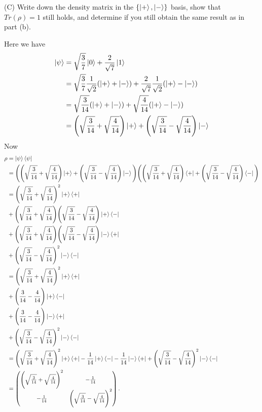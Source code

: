 \documentclass[10pt]{article}
\begin{document}
(C) Write down the density matrix in the $\{ \ket{+}, \ket{-} \}$ basis, show that $Tr(\rho) = 1$ still holds, and determine if you still obtain the same result as in part (b).

Here we have
\begin{align*}
\ket{\psi} &= \sqrt{\frac{3}{7}} \ket{0} + \frac{2}{\sqrt{7}} \ket{1} \\
                &= \sqrt{\frac{3}{7}} \frac{1}{\sqrt{2}} (\ket{+} + \ket{-}) + \frac{2}{\sqrt{7}} \frac{1}{\sqrt{2}} (\ket{+} - \ket{-}) \\
                &= \sqrt{\frac{3}{14}} (\ket{+} + \ket{-}) + \sqrt{\frac{4}{14}}(\ket{+} - \ket{-}) \\
                &= \Bigg( \sqrt{\frac{3}{14}} + \sqrt{\frac{4}{14}} \Bigg) \ket{+} + \Bigg( \sqrt{\frac{3}{14}}- \sqrt{\frac{4}{14}} \Bigg) \ket{-} 
\end{align*}
Now
\begin{align*}
\rho &= \ket{\psi} \bra{\psi} \\
        &= \Bigg( \Bigg( \sqrt{\frac{3}{14}} + \sqrt{\frac{4}{14}} \Bigg) \ket{+} + \Bigg( \sqrt{\frac{3}{14}}- \sqrt{\frac{4}{14}} \Bigg) \ket{-} \Bigg) \Bigg( \Bigg( \sqrt{\frac{3}{14}} + \sqrt{\frac{4}{14}} \Bigg) \bra{+} + \Bigg( \sqrt{\frac{3}{14}}- \sqrt{\frac{4}{14}} \Bigg) \bra{-} \Bigg) \\
        &= 
        \Bigg( \sqrt{\frac{3}{14}} + \sqrt{\frac{4}{14}} \Bigg)^2 \ket{+} \bra{+} \\
        &+ \Bigg( \sqrt{\frac{3}{14}} + \sqrt{\frac{4}{14}} \Bigg) \Bigg( \sqrt{\frac{3}{14}}- \sqrt{\frac{4}{14}} \Bigg) \ket{+} \bra{-} \\
        &+ \Bigg( \sqrt{\frac{3}{14}} + \sqrt{\frac{4}{14}} \Bigg) \Bigg( \sqrt{\frac{3}{14}}- \sqrt{\frac{4}{14}} \Bigg) \ket{-} \bra{+} \\
        &+ \Bigg( \sqrt{\frac{3}{14}} - \sqrt{\frac{4}{14}} \Bigg)^2 \ket{-} \bra{-} \\
        &= 
        \Bigg( \sqrt{\frac{3}{14}} + \sqrt{\frac{4}{14}} \Bigg)^2 \ket{+} \bra{+} \\
        &+ \Bigg( \frac{3}{14} - \frac{4}{14} \Bigg) \ket{+} \bra{-} \\
        &+ \Bigg( \frac{3}{14} - \frac{4}{14} \Bigg) \ket{-} \bra{+} \\
        &+ \Bigg( \sqrt{\frac{3}{14}} - \sqrt{\frac{4}{14}} \Bigg)^2 \ket{-} \bra{-} \\
        &= \Bigg( \sqrt{\frac{3}{14}} + \sqrt{\frac{4}{14}} \Bigg)^2 \ket{+} \bra{+} 
        -\frac{1}{14} \ket{+} \bra{-} 
        -\frac{1}{14} \ket{-} \bra{+} 
        + \Bigg( \sqrt{\frac{3}{14}} - \sqrt{\frac{4}{14}} \Bigg)^2 \ket{-} \bra{-} \\
        &= \begin{pmatrix}
        \Bigg( \sqrt{\frac{3}{14}} + \sqrt{\frac{4}{14}} \Bigg)^2 & -\frac{1}{14} \\
        -\frac{1}{14} & \Bigg( \sqrt{\frac{3}{14}} - \sqrt{\frac{4}{14}} \Bigg)^2
        \end{pmatrix}.
\end{align*}
\end{document}

